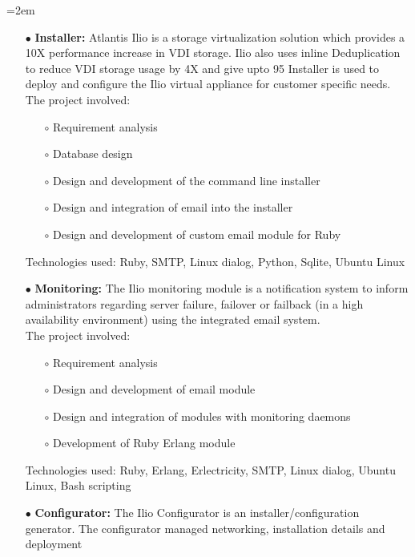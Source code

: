 \documentclass{scrartcl}
\newcommand{\MarginDate}[1]{\marginpar{\raggedleft\itshape\small#1}}
\newcommand{\Description}[1]{\hangindent=2em\hangafter=0\noindent\raggedright\footnotesize{#1}\par\normalsize}
\begin{document}
\begin{cv}{
\href{http://www.develmj.com}{}
}
\vspace{0.5em}

\Description{
\begin{itemize}
\item[\footnotesize$\bullet$] \textbf{Installer: } \MarginDate{Atlantis Ilio}Atlantis Ilio is a storage virtualization solution which provides a
  10X performance increase in VDI storage. Ilio also uses inline Deduplication
  to reduce VDI storage usage by 4X and give upto 95%
  Installer is used to deploy and configure the Ilio virtual appliance for
  customer specific needs.\\
  The project involved:
{\scriptsize
  \begin{itemize}
  \item[\footnotesize$\circ$] Requirement analysis
  \item[\footnotesize$\circ$] Database design
  \item[\footnotesize$\circ$] Design and development of the command line installer
  \item[\footnotesize$\circ$] Design and integration of email into the installer
  \item[\footnotesize$\circ$] Design and development of custom email
    module for Ruby
  \end{itemize}}
  Technologies used: Ruby, SMTP, Linux dialog, Python, Sqlite, Ubuntu Linux
\item[\footnotesize$\bullet$] \textbf{Monitoring: } The Ilio monitoring module is a notification system to inform
administrators regarding server failure, failover or failback (in a high
availability environment) using the integrated email system.\\
The project involved:
{\scriptsize
  \begin{itemize}
  \item[\footnotesize$\circ$] Requirement analysis
  \item[\footnotesize$\circ$] Design and development of email module
  \item[\footnotesize$\circ$] Design and integration of modules with monitoring daemons
  \item[\footnotesize$\circ$] Development of Ruby Erlang module
  \end{itemize}}
  Technologies used: Ruby, Erlang, Erlectricity, SMTP, Linux dialog, Ubuntu
  Linux, Bash scripting
\item[\footnotesize$\bullet$] \textbf{Configurator: } The Ilio Configurator is an installer/configuration generator.
    The configurator managed networking, installation details and deployment

\end{itemize}}
\end{cv}
\end{document}

